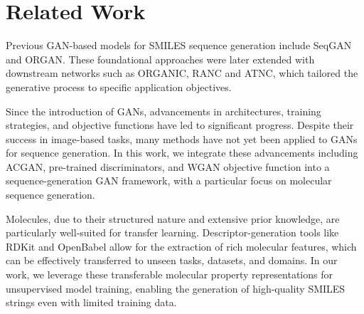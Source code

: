 \documentclass[10pt, twocolumn]{article}
\begin{document}
\section{Related Work}

Previous GAN-based models for SMILES sequence generation include SeqGAN and ORGAN. These foundational approaches were later extended with downstream networks such as ORGANIC\cite{Sanchez-Lengeling2017}, RANC\cite{Putin2018a} and ATNC\cite{Putin2018b}, which tailored the generative process to specific application objectives. %

Since the introduction of GANs\cite{Goodfellow2020}, advancements in architectures\cite{Radford2015,Odena2016,Karras2018,Karras2021,Huang2025}, training strategies\cite{Karras2017}, and objective functions\cite{Durugkar2016,Arjovsky2017,Albuquerque2019,Kumari2021} have led to significant progress. Despite their success in image-based tasks, many methods have not yet been applied to GANs for sequence generation. In this work, we integrate these advancements including ACGAN, pre-trained discriminators, and WGAN objective function into a sequence-generation GAN framework, with a particular focus on molecular sequence generation.%

Molecules, due to their structured nature and extensive prior knowledge, are particularly well-suited for transfer learning. Descriptor-generation tools like RDKit\cite{rdkit} and OpenBabel\cite{O'Boyle2011} allow for the extraction of rich molecular features, which can be effectively transferred to unseen tasks, datasets, and domains. In our work, we leverage these transferable molecular property representations for unsupervised model training, enabling the generation of high-quality SMILES strings even with limited training data.
\end{document}
